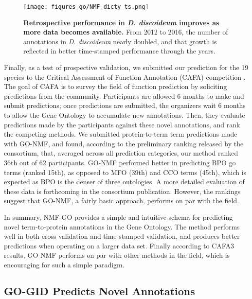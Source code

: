 \documentclass[12pt,a4paper]{report}
\begin{document}
{{\begin{figure}
\begin{minipage}[c][\textheight]{\textwidth}
\vspace*{-3.5in}
\centering
  \texttt{[image: figures\_go/NMF\_dicty\_ts.png]}
  \caption[Performance improves as more data becomes available \textit{D. discoideum}.]{\textbf{Retrospective performance in \textit{D. discoideum} improves as more data becomes available.} From 2012 to 2016, the number of annotations in \textit{D. discoideum} nearly doubled, and that growth is reflected in better time-stamped performance through the years.}
  \label{fig:nmf_dicty}
  \end{minipage}

\end{figure}


Finally, as a test of prospective validation, we submitted our prediction for the 19 species to the Critical Assessment of Function Annotation (CAFA) competition \cite{cafa2}. The goal of CAFA is to survey the field of function prediction by soliciting predictions from the community. Participants are allowed 6 months to make and submit predictions; once predictions are submitted, the organizers wait 6 months to allow the Gene Ontology to accumulate new annotations. Then, they evaluate predictions made by the participants against these novel annotations, and rank the competing methods. We submitted protein-to-term term predictions made with GO-NMF, and found, according to the preliminary ranking released by the consortium, that, averaged across all prediction categories, our method ranked 36th out of 62 participants. GO-NMF performed better in predicting BPO go terms (ranked 15th), as opposed to MFO (39th) and CCO terms (45th), which is expected as BPO is the denser of three ontologies. A more detailed evaluation of these data is forthcoming in the consortium publication. However, the rankings suggest that GO-NMF, a fairly basic approach, performs on par with the field.

In summary, NMF-GO provides a simple and intuitive schema for predicting novel term-to-protein annotations in the Gene Ontology. The method performs well in both cross-validation and time-stamped validation, and produces better predictions when operating on a larger data set. Finally according to CAFA3 results, GO-NMF performs on par with other methods in the field, which is encouraging for such a simple paradigm.


\subsection{GO-GID Predicts Novel Annotations}

}}
\end{document}
